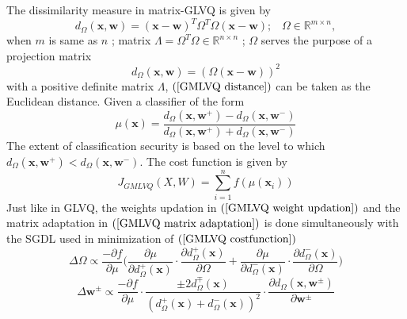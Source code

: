 The dissimilarity measure in matrix-GLVQ is given by
\begin{equation*}%
	d_\Omega\left( \mathbf{x},\mathbf{w}\right)=\left( \mathbf{x}-\mathbf{w}\right) ^{T}\Omega^{T}\Omega\left( \mathbf{x}-\mathbf{w}\right) ;\hspace{10pt} \Omega \in \mathbb{R}^{m\times n},
\end{equation*}
when\hspace{2pt} $m$\hspace{2pt} is same as\hspace{2pt} $n$ ; matrix $\Lambda=\Omega^T \Omega \in \mathbb{R}^{n\times n}$  ; $\Omega$ \hspace{2pt}serves the purpose of a projection matrix\cite{villmann2017can}
\begin{equation}\label{GMLVQ distance}
	d_\Omega \left( \mathbf{x},\mathbf{w}\right) =\left( \Omega\left( \mathbf{x}- \mathbf{w}\right)\right) ^2
\end{equation}
with a positive definite matrix\hspace{2pt} $\Lambda$, $ \left( \ref{GMLVQ distance} \right)$ can be taken as the Euclidean distance.
Given a classifier of the form
\begin{equation*}%
	\mu\left( \mathbf{x}\right) =\frac{d_\Omega\left( \mathbf{x},\mathbf{w}^{+}\right)-d_\Omega\left( \mathbf{x},\mathbf{w}^{-}\right)  }{d_\Omega\left( \mathbf{x},\mathbf{w}^{+}\right)+d_\Omega\left( \mathbf{x},\mathbf{w}^{-} \right) }
\end{equation*}
The extent of classification security is based on the level to which\hspace{2pt} $d_\Omega\left( \mathbf{x},\mathbf{w}^{+}\right)<d_\Omega\left( \mathbf{x},\mathbf{w}^{-}\right)$\cite{article}.
The cost function is given by
\begin{equation}\label{GMLVQ costfunction}
	J_{GMLVQ}\left( X,W\right) =\sum_{i=1}^{n}f\left( \mu\left( \mathbf{x}_i\right) \right) 
\end{equation}
Just like in GLVQ, the weights updation in $\left(  \ref{GMLVQ weight updation}\right)$ and the matrix adaptation in $\left( \ref{GMLVQ matrix adaptation}\right)$  is done simultaneously\cite{schneider2009adaptive} with the SGDL used in minimization of $\left( \ref{GMLVQ costfunction}\right)$
\begin{equation}\label{GMLVQ matrix adaptation}
	\Delta \Omega\propto \frac{-\partial f}{\partial \mu}\Bigg(  \frac{\partial \mu}{\partial d_{\Omega}^{+}\left( \mathbf{x}\right)}\cdot\frac{\partial d_{\Omega}^{+}\left( \mathbf{x}\right) }{\partial \Omega}+\frac{\partial \mu}{\partial d_{\Omega}^{-}\left( \mathbf{x}\right)}\cdot\frac{\partial d_{\Omega}^{-}\left( \mathbf{x}\right) }{\partial \Omega} \Bigg)
\end{equation}
\begin{equation}\label{GMLVQ weight updation}
	\Delta \mathbf{w}^{\pm}\propto \frac{-\partial f}{\partial \mu}\cdot\frac{\pm 2d_{\Omega}^{\mp}\left( \mathbf{x}\right) }{\left( d_{\Omega}^{+}\left( \mathbf{x}\right) +d_{\Omega}^{-}\left( \mathbf{x}\right) \right)^2 }\cdot\frac{\partial d_{\Omega}\left( \mathbf{x},\mathbf{w}^{\pm }\right) }{\partial \mathbf{w}^{\pm}}
\end{equation}


